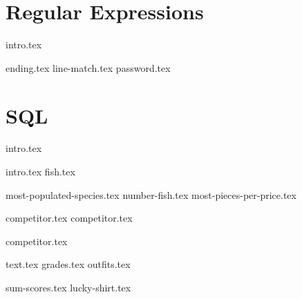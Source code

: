 \documentclass{exam}
\begin{document}
\newpage
\section{Regular Expressions}
{intro.tex}

\newpage
\begin{questions}
{ending.tex}
{line-match.tex}
{password.tex}
\end{questions}

\newpage
\section{SQL}
{intro.tex}

\newpage
{intro.tex}
{fish.tex}
\begin{questions}
  {most-populated-species.tex}
  {number-fish.tex}
  {most-pieces-per-price.tex}
\end{questions}

\newpage
{competitor.tex}
{competitor.tex}
\begin{questions}
{competitor.tex}
\end{questions}

\newpage
{text.tex}
{grades.tex}
{outfits.tex}
\begin{questions}
{sum-scores.tex}
{lucky-shirt.tex}
\end{questions}

\newpage
\end{document}
